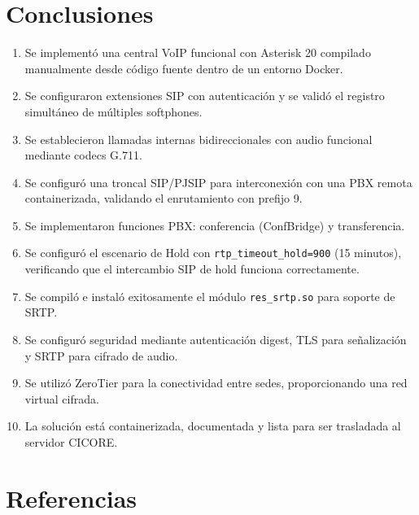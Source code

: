 \documentclass[12pt,a4paper]{article}
\begin{document}
\section{Conclusiones}

\begin{enumerate}
    \item Se implementó una central VoIP funcional con Asterisk 20 compilado manualmente desde código fuente dentro de un entorno Docker.
    \item Se configuraron extensiones SIP con autenticación y se validó el registro simultáneo de múltiples softphones.
    \item Se establecieron llamadas internas bidireccionales con audio funcional mediante codecs G.711.
    \item Se configuró una troncal SIP/PJSIP para interconexión con una PBX remota containerizada, validando el enrutamiento con prefijo 9.
    \item Se implementaron funciones PBX: conferencia (ConfBridge) y transferencia.
    \item Se configuró el escenario de Hold con \texttt{rtp\_timeout\_hold=900} (15 minutos), verificando que el intercambio SIP de hold funciona correctamente.
    \item Se compiló e instaló exitosamente el módulo \texttt{res\_srtp.so} para soporte de SRTP.
    \item Se configuró seguridad mediante autenticación digest, TLS para señalización y SRTP para cifrado de audio.
    \item Se utilizó ZeroTier para la conectividad entre sedes, proporcionando una red virtual cifrada.
    \item La solución está containerizada, documentada y lista para ser trasladada al servidor CICORE.
\end{enumerate}

\section{Referencias}
\end{document}
